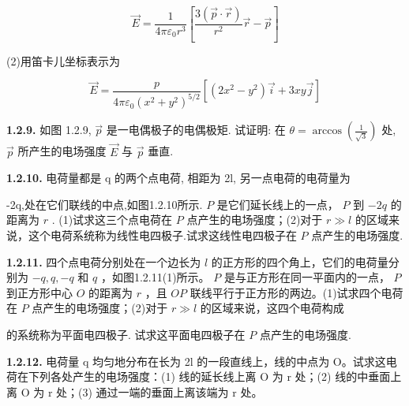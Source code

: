 $$
\vec{E} = \frac {1}{4 \pi \varepsilon_ {0} r ^ {3}} \left[ \frac {3 (\vec{p} \cdot \vec{r})}{r ^ {2}} \vec{r} - \vec{p} \right]
$$

(2)用笛卡儿坐标表示为

$$
\vec{E} = \frac {p}{4 \pi \varepsilon_ {0} (x ^ {2} + y ^ {2}) ^ {5 / 2}} [ (2 x ^ {2} - y ^ {2}) \vec{i} + 3 x y \vec{j} ]
$$



\begin{center}
\end{center}


\vfill

\textbf{1.2.9.} 如图 1.2.9, $\vec{p}$ 是一电偶极子的电偶极矩. 试证明: 在 $\displaystyle \theta = \arccos\left(\frac{1}{\sqrt{3}}\right)$ 处, $\vec{p}$ 所产生的电场强度 $\vec{E}$ 与 $\vec{p}$ 垂直.

\vfill

\newpage
\textbf{1.2.10.} 电荷量都是 q 的两个点电荷, 相距为 2l, 另一点电荷的电荷量为


-2q,处在它们联线的中点,如图1.2.10所示. $P$ 是它们延长线上的一点， $P$ 到 $-2q$ 的距离为 $r$ . (1)试求这三个点电荷在 $P$ 点产生的电场强度；(2)对于 $r \gg l$ 的区域来说，这个电荷系统称为线性电四极子.试求这线性电四极子在 $P$ 点产生的电场强度.

\begin{center}
\end{center}

\vfill

\textbf{1.2.11.} 四个点电荷分别处在一个边长为 $l$ 的正方形的四个角上，它们的电荷量分别为 $-q, q, -q$ 和 $q$ ，如图1.2.11(1)所示。 $P$ 是与正方形在同一平面内的一点， $P$ 到正方形中心 $O$ 的距离为 $r$ ，且 $OP$ 联线平行于正方形的两边。(1)试求四个电荷在 $P$ 点产生的电场强度；(2)对于 $r \gg l$ 的区域来说，这四个电荷构成


的系统称为平面电四极子. 试求这平面电四极子在 $P$ 点产生的电场强度.

\begin{center}
\end{center}

\vfill

\newpage
\textbf{1.2.12.} 电荷量 q 均匀地分布在长为 2l 的一段直线上，线的中点为 O。试求这电荷在下列各处产生的电场强度：(1) 线的延长线上离 O 为 r 处；(2) 线的中垂面上离 O 为 r 处；(3) 通过一端的垂面上离该端为 r 处。


